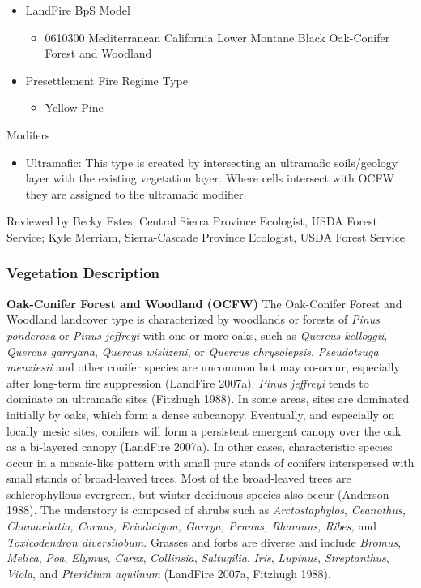 \begin{itemize}
\begin{itemize}
		\item LandFire BpS Model
		\begin{itemize}
			\item 0610300 Mediterranean California Lower Montane Black Oak-Conifer Forest and Woodland
		\end{itemize}
		
		\item Presettlement Fire Regime Type
		\begin{itemize}
			\item Yellow Pine
		\end{itemize}
\end{itemize}
\end{itemize}

Modifers
\begin{itemize}
	\item Ultramafic: This type is created by intersecting an ultramafic soils/geology layer with the existing vegetation layer. Where cells intersect with OCFW they are assigned to the ultramafic modifier.
\end{itemize}

\noindent Reviewed by Becky Estes, Central Sierra Province Ecologist, USDA Forest Service; Kyle Merriam, Sierra-Cascade Province Ecologist, USDA Forest Service


\subsubsection{Vegetation Description}
\textbf{Oak-Conifer Forest and Woodland (OCFW)} The Oak-Conifer Forest and Woodland landcover type is characterized by woodlands or forests of \emph{Pinus ponderosa} or \emph{Pinus jeffreyi} with one or more oaks, such as \emph{Quercus kelloggii}, \emph{Quercus garryana}, \emph{Quercus wislizeni}, or \emph{Quercus chrysolepsis}. \emph{Pseudotsuga menziesii} and other conifer species are uncommon but may co-occur, especially after long-term fire suppression (LandFire 2007a). \emph{Pinus jeffreyi} tends to dominate on ultramafic sites (Fitzhugh 1988). In some areas, sites are dominated initially by oaks, which form a dense subcanopy. Eventually, and especially on locally mesic sites, conifers will form a persistent emergent canopy over the oak as a bi-layered canopy (LandFire 2007a). In other cases, characteristic species occur in a mosaic-like pattern with small pure stands of conifers interspersed with small stands of broad-leaved trees. Most of the broad-leaved trees are schlerophyllous evergreen, but winter-deciduous species also occur (Anderson 1988). The understory is composed of shrubs such as \emph{Arctostaphylos}, \emph{Ceanothus, Chamaebatia, Cornus, Eriodictyon, Garrya, Prunus, Rhamnus, Ribes,} and \emph{Toxicodendron diversilobum}. Grasses and forbs are diverse and include \emph{Bromus}, \emph{Melica}, \emph{Poa}, \emph{Elymus}, \emph{Carex}, \emph{Collinsia}, \emph{Saltugilia}, \emph{Iris}, \emph{Lupinus}, \emph{Streptanthus}, \emph{Viola}, and \emph{Pteridium aquilnum} (LandFire 2007a, Fitzhugh 1988).

